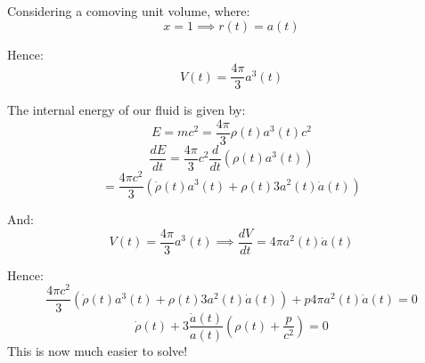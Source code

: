 Considering a comoving unit volume, where:
\[
    x = 1 \implies r(t) = a(t)
\]

Hence:
\[
    V(t) = \frac{4 \pi}{3} a^3(t)
\]

The internal energy of our fluid is given by:
\[
    E = mc^2 = \frac{4 \pi}{3} \rho(t) a^3(t) c^2
\]
\[
    \frac{dE}{dt} = \frac{4 \pi}{3} c^2 \frac{d}{dt} \left(\rho(t) a^3(t)\right)
\]
\[
    = \frac{4 \pi c^2}{3} \left(\dot{\rho}(t) a^3(t) +\rho(t) 3a^2(t) \dot{a}(t)\right)
\]

And:
\[
V(t) = \frac{4 \pi}{3} a^3(t) \implies \frac{dV}{dt} = 4 \pi a^2(t) \dot{a}(t)
\]

Hence:
\[
    \frac{4 \pi c^2}{3} \left(\dot{\rho}(t) a^3(t) +\rho(t) 3a^2(t) \dot{a}(t)\right) + p 4 \pi a^2(t) \dot{a}(t) = 0
\]
\[
    \dot{\rho}(t) + 3 \frac{\dot{a}(t)}{a(t)} \left(\rho (t) + \frac{p}{c^2}\right) = 0
\]
This is now much easier to solve!


